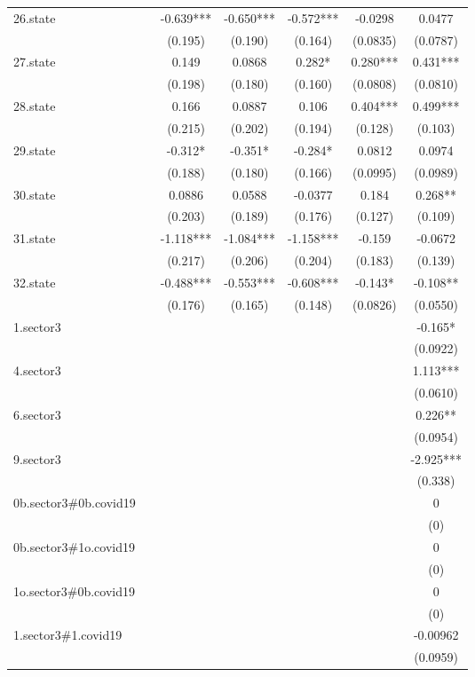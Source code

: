 \documentclass[]{article}
\begin{document}
\begin{tabular}{lcccccc}
26.state &  & -0.639*** & -0.650*** & -0.572*** & -0.0298 & 0.0477 \\
 &  & (0.195) & (0.190) & (0.164) & (0.0835) & (0.0787) \\
27.state &  & 0.149 & 0.0868 & 0.282* & 0.280*** & 0.431*** \\
 &  & (0.198) & (0.180) & (0.160) & (0.0808) & (0.0810) \\
28.state &  & 0.166 & 0.0887 & 0.106 & 0.404*** & 0.499*** \\
 &  & (0.215) & (0.202) & (0.194) & (0.128) & (0.103) \\
29.state &  & -0.312* & -0.351* & -0.284* & 0.0812 & 0.0974 \\
 &  & (0.188) & (0.180) & (0.166) & (0.0995) & (0.0989) \\
30.state &  & 0.0886 & 0.0588 & -0.0377 & 0.184 & 0.268** \\
 &  & (0.203) & (0.189) & (0.176) & (0.127) & (0.109) \\
31.state &  & -1.118*** & -1.084*** & -1.158*** & -0.159 & -0.0672 \\
 &  & (0.217) & (0.206) & (0.204) & (0.183) & (0.139) \\
32.state &  & -0.488*** & -0.553*** & -0.608*** & -0.143* & -0.108** \\
 &  & (0.176) & (0.165) & (0.148) & (0.0826) & (0.0550) \\
1.sector3 &  &  &  &  &  & -0.165* \\
 &  &  &  &  &  & (0.0922) \\
4.sector3 &  &  &  &  &  & 1.113*** \\
 &  &  &  &  &  & (0.0610) \\
6.sector3 &  &  &  &  &  & 0.226** \\
 &  &  &  &  &  & (0.0954) \\
9.sector3 &  &  &  &  &  & -2.925*** \\
 &  &  &  &  &  & (0.338) \\
0b.sector3\#0b.covid19 &  &  &  &  &  & 0 \\
 &  &  &  &  &  & (0) \\
0b.sector3\#1o.covid19 &  &  &  &  &  & 0 \\
 &  &  &  &  &  & (0) \\
1o.sector3\#0b.covid19 &  &  &  &  &  & 0 \\
 &  &  &  &  &  & (0) \\
1.sector3\#1.covid19 &  &  &  &  &  & -0.00962 \\
 &  &  &  &  &  & (0.0959) \\

\end{tabular}
\end{document}
